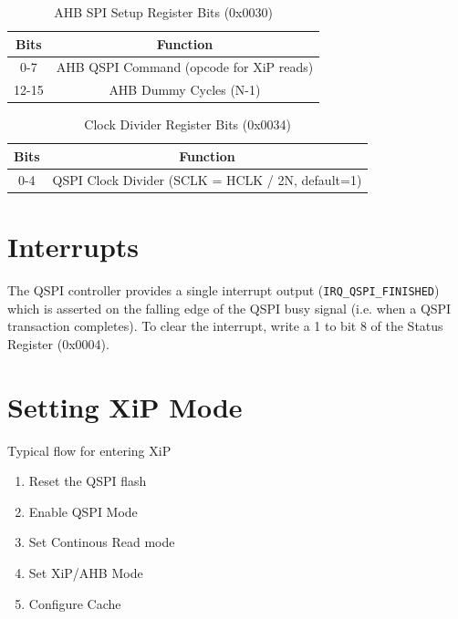 \documentclass{report}
\begin{document}
\begin{table}[!h]
    \begin{center}
    \caption{AHB SPI Setup Register Bits (0x0030)}
    \begin{tabular}{||c | c ||}
        \hline
        Bits & Function \\
        \hline\hline
        0-7 & AHB QSPI Command (opcode for XiP reads) \\
        \hline
        12-15 & AHB Dummy Cycles (N-1) \\
        \hline
    \end{tabular}
\end{center}
\end{table}

\begin{table}[!h]
    \begin{center}
    \caption{Clock Divider Register Bits (0x0034)}
    \begin{tabular}{||c | c ||}
        \hline
        Bits & Function \\
        \hline\hline
        0-4 & QSPI Clock Divider (SCLK = HCLK / 2N, default=1) \\
        \hline
    \end{tabular}
\end{center}
\end{table}

\section{Interrupts}
The QSPI controller provides a single interrupt output (\texttt{IRQ\_QSPI\_FINISHED}) which is asserted on the falling edge of the QSPI busy signal (i.e. when a QSPI transaction completes). To clear the interrupt, write a 1 to bit 8 of the Status Register (0x0004).

\section{Setting XiP Mode}
Typical flow for entering XiP
\begin{enumerate}
    \item Reset the QSPI flash
    \item Enable QSPI Mode
    \item Set Continous Read mode 
    \item Set XiP/AHB Mode
    \item Configure Cache 
\end{enumerate}
\end{document}

